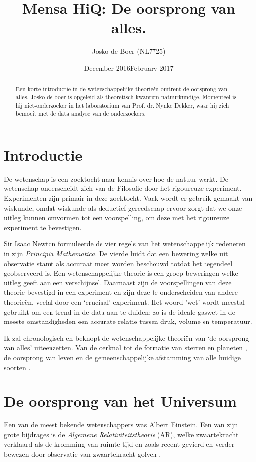 \documentclass{article}
\title{Mensa HiQ: De oorsprong van alles.}
\author{Josko de Boer (NL7725)}
\date{December 2016}
\date{February 2017}
\begin{document}
\maketitle
\begin{abstract} 
Een korte introductie in de wetenschappelijke theorie\"en omtrent de oorsprong van alles. Josko de boer is opgeleid als theoretisch kwantum natuurkundige. Momenteel is hij niet-onderzoeker in het laboratorium van Prof. dr. Nynke Dekker, waar hij zich bemoeit met de data analyse van de onderzoekers.
\end{abstract} 
    \section{Introductie}        
        De wetenschap is een zoektocht naar kennis over hoe de natuur werkt. De wetenschap onderscheidt zich van de Filosofie door het rigoureuze experiment. Experimenten zijn primair in deze zoektocht. Vaak wordt er gebruik gemaakt van wiskunde, omdat wiskunde als deductief gereedschap ervoor zorgt dat we onze uitleg kunnen omvormen tot een voorspelling, om deze met het rigoureuze experiment te bevestigen.   
        
        Sir Isaac Newton formuleerde de vier regels van het wetenschappelijk redeneren in zijn \emph{Principia Mathematica}. De vierde luidt dat een bewering welke uit observatie stamt als accuraat moet worden beschouwd totdat het tegendeel geobserveerd is. Een wetenschappelijke theorie is een groep beweringen welke uitleg geeft aan een verschijnsel. Daarnaast zijn de voorspellingen van deze theorie bevestigd in een experiment en zijn deze te onderscheiden van andere theorie\"en, veelal door een `cruciaal' experiment. Het woord 'wet' wordt meestal gebruikt om een trend in de data aan te duiden; zo is de ideale gaswet in de meeste omstandigheden een accurate relatie tussen druk, volume en temperatuur.
        
        Ik zal chronologisch en beknopt de wetenschappelijke theori\"en van `de oorsprong van alles' uiteenzetten. Van de oerknal \cite{oerknal} tot de formatie van sterren \cite{ster} en planeten \cite{planeet}, de oorsprong van leven \cite{leven} en de gemeenschappelijke afstamming van alle huidige soorten \cite{afstamming}.
    \section{De oorsprong van het Universum}
        Een van de meest bekende wetenschappers was Albert Einstein. Een van zijn grote bijdrages is de \emph{Algemene Relativiteitstheorie} (AR), welke zwaartekracht verklaard als de kromming van ruimte-tijd en zoals recent gevierd en verder bewezen door observatie van zwaartekracht golven \cite{ligo}. 
        
\end{document}
